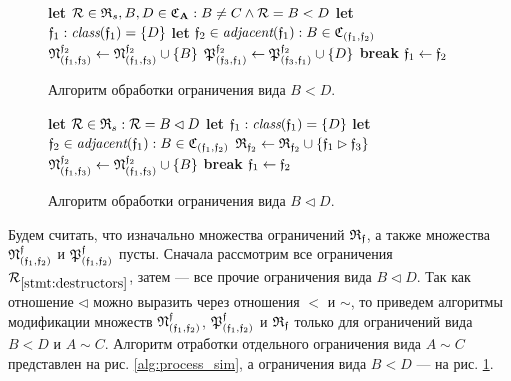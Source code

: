 \begin{figure}[htb!]
\begin{algorithmic}[1]
\STATE \textbf{let} $\mathcal{R} \in \mathfrak{R}_s, B, D \in \mathfrak{C}_{\mathbf{A}}: B \ne C \wedge \mathcal{R} = B < D$
\STATE \textbf{let} $\mathfrak{f}_1: \textit{class}(\mathfrak{f}_1) = \{D\}$
    \STATE {}
    \STATE \textbf{let} $\mathfrak{f}_2 \in \textit{adjacent}(\mathfrak{f}_1): B \in \mathfrak{C}_{(\mathfrak{f}_1, \mathfrak{f}_2)}$
        \STATE $\mathfrak{N}^{\mathfrak{f}_2}_{(\mathfrak{f}_1, \mathfrak{f}_3)} \gets \mathfrak{N}^{\mathfrak{f}_2}_{(\mathfrak{f}_1, \mathfrak{f}_3)} \cup \{B\}$
        \STATE $\mathfrak{P}^{\mathfrak{f}_2}_{(\mathfrak{f}_3, \mathfrak{f}_1)} \gets \mathfrak{P}^{\mathfrak{f}_2}_{(\mathfrak{f}_3, \mathfrak{f}_1)} \cup \{D\}$
        \STATE \textbf{break}
    \ENDIF
    \STATE $\mathfrak{f}_1 \gets \mathfrak{f}_2$
\ENDWHILE
\end{algorithmic}
\caption{Алгоритм обработки ограничения вида $B < D$.}
\label{alg:process_less}
\end{figure}

\begin{figure}[htb!]
\begin{algorithmic}[1]
\STATE \textbf{let} $\mathcal{R} \in \mathfrak{R}_s: \mathcal{R} = B \lhd D$
\STATE \textbf{let} $\mathfrak{f}_1: \textit{class}(\mathfrak{f}_1) = \{D\}$
    \STATE {}
    \STATE \textbf{let} $\mathfrak{f}_2 \in \textit{adjacent}(\mathfrak{f}_1): B \in \mathfrak{C}_{(\mathfrak{f}_1, \mathfrak{f}_2)}$
        \STATE $\mathfrak{R}_{\mathfrak{f}_2} \gets \mathfrak{R}_{\mathfrak{f}_2} \cup \{\mathfrak{f}_1 \rhd \mathfrak{f}_3\}$
        \STATE $\mathfrak{N}^{\mathfrak{f}_2}_{(\mathfrak{f}_1, \mathfrak{f}_3)} \gets \mathfrak{N}^{\mathfrak{f}_2}_{(\mathfrak{f}_1, \mathfrak{f}_3)} \cup \{B\}$
        \STATE \textbf{break}
    \ENDIF
    \STATE $\mathfrak{f}_1 \gets \mathfrak{f}_2$
\ENDWHILE
\end{algorithmic}
\caption{Алгоритм обработки ограничения вида $B \lhd D$.}
\label{alg:process_lhd}
\end{figure}
\fi

Будем считать, что изначально множества ограничений $\mathfrak{R}_{\mathfrak{f}}$, а также множества $\mathfrak{N}^{\mathfrak{f}}_{(\mathfrak{f}_1, \mathfrak{f}_2)}$ и $\mathfrak{P}^{\mathfrak{f}}_{(\mathfrak{f}_1, \mathfrak{f}_2)}$ пусты. Сначала рассмотрим все ограничения $\mathcal{R}_{\ref{stmt:destructors}}$, затем --- все прочие ограничения вида $B \lhd D$. Так как отношение $\lhd$ можно выразить через отношения $<$ и $\sim$, то приведем алгоритмы модификации множеств $\mathfrak{N}^{\mathfrak{f}}_{(\mathfrak{f}_1, \mathfrak{f}_2)}$, $\mathfrak{P}^{\mathfrak{f}}_{(\mathfrak{f}_1, \mathfrak{f}_2)}$ и $\mathfrak{R}_{\mathfrak{f}}$ только для ограничений вида $B < D$ и $A \sim C$. Алгоритм отработки отдельного ограничения вида $A \sim C$ представлен на рис. \ref{alg:process_sim}, а ограничения вида $B < D$ --- на рис. \ref{alg:process_less}.

